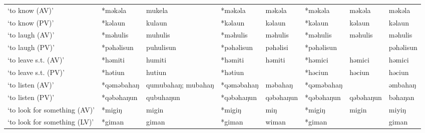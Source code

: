 \begin{landscape}
\begin{longtable}[c]{@{}p{3cm}<{\raggedright}p{2.75cm}<{\raggedright}p{2.75cm}<{\raggedright}p{2.75cm}<{\raggedright}p{2.75cm}<{\raggedright}p{2.75cm}<{\raggedright}p{2.75cm}<{\raggedright}p{2.75cm}<{\raggedright}@{}}
`to know (AV)'                                       & *məkəla      & mukela                        & *məkəla        & məkəla                     & *məkəla          & məkəla                   & məkəla                            \\
`to know (PV)'                                       & *kəlaun      & kulaun                        & *kəlaun        & kəlaun                     & *kəlaun          & kəlaun                   & kəlaun                            \\
`to laugh (AV)'                                      & *məhulis     & muhulis                       & *məhulis       & məhulis                    & *məhulis         & məhulis                  & məhulis                           \\
`to laugh (PV)'                                      & *pəhəlisun   & puhulisun                     & *pəhəlisun     & pəhəlisi                   & *pəhəlisun       &                          & pəhəlisun                         \\
`to leave s.t. (AV)'                                 & *həmiti      & humiti                        & *həmiti        & həmiti                     & *həmici          & həmici                   & həmici                            \\
`to leave s.t. (PV)'                                 & *hətiun      & hutiun                        & *hətiun        &                            & *həciun          & həciun                   & həciun                            \\
`to listen (AV)'                                     & *qəməbahaŋ   & qumubahaŋ; mubahaŋ            & *qəməbahaŋ     & məbahaŋ                    & *qəməbahaŋ       &                          & əmbahaŋ                           \\
`to listen (PV)'                                     & *qəbəhaŋun   & qubuhaŋun                     & *qəbəhaŋun     & qəbəhaŋun                  & *qəbəhaŋun       & qəbəhaŋun                & bəhaŋan                           \\
`to look for something (AV)'                         & *migiŋ       & migin                         & *migiŋ         & miŋ                        & *migiŋ           & migin                    & miyiŋ                             \\
`to look for something (LV)'                         & *giman       & giman                         & *giman         & wiman                      & *giman           &                          & giman                             \\

\end{longtable}
\end{landscape}
